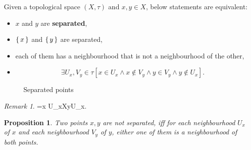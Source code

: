 \documentclass[12pt, letterpaper]{article}
\renewcommand{\emptyset}{\varnothing}
\newenvironment{eqlong}{\equation\aligned}{\endaligned\endequation}
\newtheorem{prop}{Proposition}[section]
\theoremstyle{definition}
\theoremstyle{remark}
\newtheorem*{rem*}{Remark}
\theoremstyle{definition}
\theoremstyle{plain}
\numberwithin{equation}{section}
\begin{document}
	\begin{def*}
		Given a topological space $(X,\tau)$ and $x,y\in X$,
		below statements are equivalent:
		\begin{itemize}
			\item $x$ and $y$ are \textbf{separated},
			\item $\set{x}$ and $\set{y}$ are separated,
			\item each of them has a neighbourhood that is not a neighbourhood of the other,
			\item \[\exists U_x,V_y\in\tau[x\in U_x\land x\notin V_y\land y\in V_y\land y\notin U_x]. \]
		\end{itemize}
	
		\begin{figure}[H]
			\centering
			\caption{Separated points}
			\label{fig:separated_points}
		\end{figure}
	\end{def*}
	\begin{rem*}
		\begin{eqlong}
			\cap {} =\emptyset \iff x\notin{}\iff
						U_x\subseteq X\setminus{}\iff y\notin U_x\in\tau.
		\end{eqlong}
	\end{rem*}
	\begin{prop}
		Two	points $x,y$ are not separated, iff
		for each neighbourhood $U_x$ of $x$ and each neighbourhood $V_y$ of $y$,
		either one of them is a neighbourhood of both points.
	\end{prop}
\end{document}
